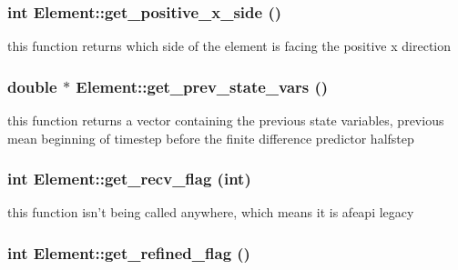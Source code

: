 \hypertarget{classElement_a70}{
\subsubsection[get\_\-positive\_\-x\_\-side]{\setlength{\rightskip}{0pt plus 5cm}int Element::get\_\-positive\_\-x\_\-side ()}}
\label{classElement_a70}


this function returns which side of the element is facing the positive x direction 

\hypertarget{classElement_a72}{
\subsubsection[get\_\-prev\_\-state\_\-vars]{\setlength{\rightskip}{0pt plus 5cm}double $\ast$ Element::get\_\-prev\_\-state\_\-vars ()}}
\label{classElement_a72}


this function returns a vector containing the previous state variables, previous mean beginning of timestep before the finite difference predictor halfstep 

\hypertarget{classElement_a41}{
\subsubsection[get\_\-recv\_\-flag]{\setlength{\rightskip}{0pt plus 5cm}int Element::get\_\-recv\_\-flag (int)}}
\label{classElement_a41}


this function isn't being called anywhere, which means it is afeapi legacy 

\hypertarget{classElement_a33}{
\subsubsection[get\_\-refined\_\-flag]{\setlength{\rightskip}{0pt plus 5cm}int Element::get\_\-refined\_\-flag ()}}
\label{classElement_a33}


